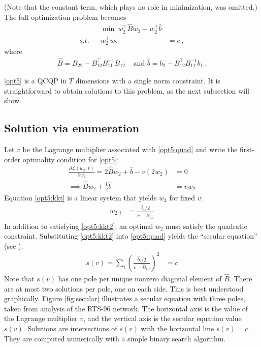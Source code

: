 \documentclass[conference]{IEEEtran}
\begin{document}
(Note that the constant term, which plays no role in minimization, was omitted.) The full optimization problem becomes
\begin{subequations}\label{opt5}
\begin{align}
&& \min~ w_2^\top \hat{B}w_2 + w_2^\top \hat{b} \\
\label{opt5:quad} s.t. && w_2^\top w_2 &= c~,
\end{align}
\end{subequations}
where
\begin{align*}
\hat{B} = B_{22} - B_{12}^\top B_{11}^{-1}B_{12} &\text{ and }\hat{b} = b_2 - B_{12}^\top B_{11}^{-1}b_1~.
\end{align*}

\eqref{opt5} is a QCQP in $T$ dimensions with a single norm constraint. It is straightforward to obtain solutions to this problem, as the next subsection will show.

\subsection{Solution via enumeration}

Let $v$ be the Lagrange multiplier associated with \eqref{opt5:quad} and write the first-order optimality condition for \eqref{opt5}:
\begin{align}
\nonumber \frac{\partial \mathcal{L}(w_2,v)}{\partial w_2} = 2\hat{B}w_2 + \hat{b} - v(2w_2) &= 0 \\
\label{opt5:kkt} \implies \hat{B}w_2 + \frac{1}{2}\hat{b} &= vw_2
\end{align}
Equation \eqref{opt5:kkt} is a linear system that yields $w_2$ for fixed $v$:
\begin{align}
\label{opt5:kkt2}w_{2,i} &= \frac{\hat{b}_i/2}{v - \hat{B}_{i,i}}
\end{align}
In addition to satisfying \eqref{opt5:kkt2}, an optimal $w_2$ must satisfy the quadratic constraint. Substituting \eqref{opt5:kkt2} into \eqref{opt5:quad} yields the ``secular equation'' (see \cite{bienstock2014}):
\begin{align}
s(v) = \sum_{i}\left( \frac{\hat{b}_i /2}{v - \hat{B}_{i,i}}\right)^2 &= c
\end{align}
Note that $s(v)$ has one pole per unique nonzero diagonal element of $\hat{B}$. There are at most two solutions per pole, one on each side. This is best understood graphically. Figure \ref{fig:secular} illustrates a secular equation with three poles, taken from analysis of the RTS-96 network. The horizontal axis is the value of the Lagrange multiplier $v$, and the vertical axis is the secular equation value $s(v)$. Solutions are intersections of $s(v)$ with the horizontal line $s(v)=c$. They are computed numerically with a simple binary search algorithm.
\end{document}
